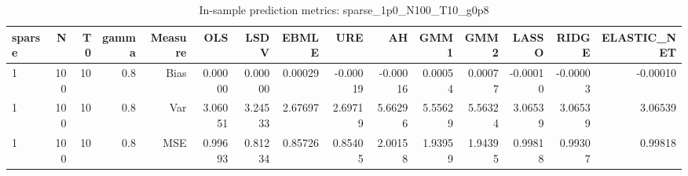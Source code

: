 \begin{table}[!htbp]\centering
\caption{In-sample prediction metrics: sparse_1p0_N100_T10_g0p8}
\label{tab:table2_sparse_1p0_N100_T10_g0p8}
\begin{tabular}{lrrrrrrrrrrrrrr}
\hline
sparse & N & T0 & gamma & Measure & OLS & LSDV & EBMLE & URE & AH & GMM1 & GMM2 & LASSO & RIDGE & ELASTIC_NET \\
\hline
1 & 100 & 10 & 0.8 & Bias & 0.00000 & 0.00000 & 0.00029 & -0.00019 & -0.00016 & 0.00054 & 0.00077 & -0.00010 & -0.00003 & -0.00010 \\
1 & 100 & 10 & 0.8 & Var & 3.06051 & 3.24533 & 2.67697 & 2.69719 & 5.66296 & 5.55629 & 5.56324 & 3.06539 & 3.06539 & 3.06539 \\
1 & 100 & 10 & 0.8 & MSE & 0.99693 & 0.81234 & 0.85726 & 0.85405 & 2.00158 & 1.93959 & 1.94395 & 0.99818 & 0.99307 & 0.99818 \\
\hline
\end{tabular}
\end{table}

